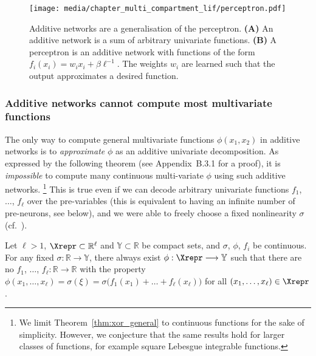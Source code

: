 \begin{figure}
	\centering
	\texttt{[image: media/chapter\_multi\_compartment\_lif/perceptron.pdf]}%
	{\label{fig:perceptron_a}}%
	{\label{fig:perceptron_b}}%
	\caption[Additive networks are a generalisation of the perceptron]{Additive networks are a generalisation of the perceptron. \textbf{(A)} An additive network is a sum of arbitrary univariate functions. \textbf{(B)} A perceptron is an additive network with functions of the form $f_i(x_i) = w_i x_i + \beta \ell^{-1}$. The weights $w_i$ are learned such that the output approximates a desired function.}
\end{figure}

\subsubsection{Additive networks cannot compute most multivariate functions}
The only way to compute general multivariate functions $\phi(x_1, x_2)$ in additive networks is to \emph{approximate} $\phi$ as an additive univariate decomposition.
As expressed by the following theorem (see Appendix~B.3.1 for a proof), it is \emph{impossible} to compute many continuous multi-variate $\phi$ using such additive networks.%
\footnote{We limit Theorem~\ref{thm:xor_general} to continuous functions for the sake of simplicity.
However, we conjecture that the same results hold for larger classes of functions, for example square Lebesgue integrable functions.}
This is true even if we can decode arbitrary univariate functions $f_1$, $\ldots$, $f_\ell$ over the pre-variables (this is equivalent to having an infinite number of pre-neurons, see below), and we were able to freely choose a fixed nonlinearity $\sigma$ (cf.~).

\begin{theorem}
\label{thm:xor_general}
Let $\ell > 1$, $\Xrepr \subset \mathbb{R}^\ell$ and $\mathbb{Y} \subset \mathbb{R}$ be compact sets, and $\sigma$, $\phi$, $f_i$ be continuous.
For any fixed $\sigma : \mathbb{R} \longrightarrow \mathbb{Y}$, there always exist $\phi : \Xrepr \longrightarrow \mathbb{Y}$ such that there are no $f_1$, $\ldots$, $f_\ell : \mathbb{R}  \longrightarrow \mathbb{R}$ with the property
$\phi(x_1, \ldots, x_\ell) = \sigma(\xi) = \sigma\bigl( f_1(x_1) + \ldots + f_\ell(x_\ell) \bigr)$ for all $(x_1, \ldots, x_\ell) \in \Xrepr$.
\end{theorem}

